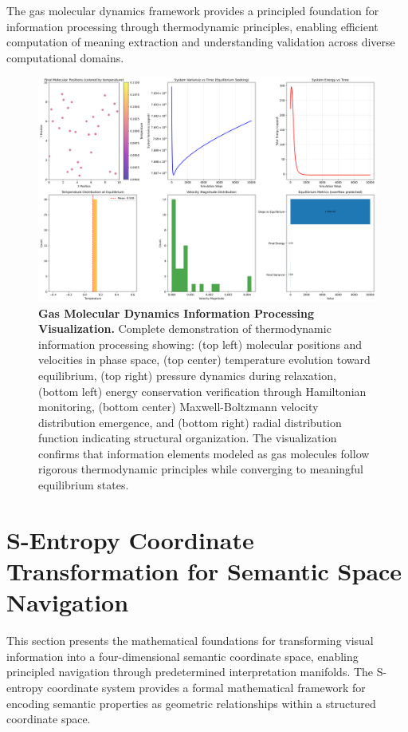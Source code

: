 \documentclass[11pt,a4paper]{article}
\begin{document}
The gas molecular dynamics framework provides a principled foundation for information processing through thermodynamic principles, enabling efficient computation of meaning extraction and understanding validation across diverse computational domains.

\begin{figure}[htbp]
\centering
\includegraphics[width=\textwidth]{images/gas_molecular_dynamics_demo.png}
\caption{\textbf{Gas Molecular Dynamics Information Processing Visualization.} Complete demonstration of thermodynamic information processing showing: (top left) molecular positions and velocities in phase space, (top center) temperature evolution toward equilibrium, (top right) pressure dynamics during relaxation, (bottom left) energy conservation verification through Hamiltonian monitoring, (bottom center) Maxwell-Boltzmann velocity distribution emergence, and (bottom right) radial distribution function indicating structural organization. The visualization confirms that information elements modeled as gas molecules follow rigorous thermodynamic principles while converging to meaningful equilibrium states.}
\label{fig:gas-molecular-dynamics}
\end{figure}

\section{S-Entropy Coordinate Transformation for Semantic Space Navigation}
\label{sec:s-entropy-coordinates}

This section presents the mathematical foundations for transforming visual information into a four-dimensional semantic coordinate space, enabling principled navigation through predetermined interpretation manifolds. The S-entropy coordinate system provides a formal mathematical framework for encoding semantic properties as geometric relationships within a structured coordinate space.
\end{document}
